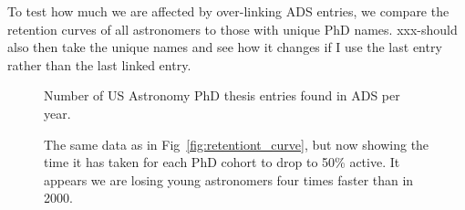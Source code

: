 \documentclass{emulateapj}
\begin{document}
To test how much we are affected by over-linking ADS entries, we compare the retention curves of all astronomers to those with unique PhD names.  xxx-should also then take the unique names and see how it changes if I use the last entry rather than the last linked entry.


\begin{figure}
  \caption{Number of US Astronomy PhD thesis entries found in ADS per year. \label{fig:phdperyear}}
\end{figure}


\begin{figure*}
  \caption{The fraction of Astronomy PhDs still active as first authors.  Error bars show ranges computed by comparing the curves to those of just authors with unique names and uique names where all records are assumed to be linked.   \label{fig:retentiont_curve}}
\end{figure*}

\begin{figure}
\caption{The same data as in Fig~\ref{fig:retentiont_curve}, but now showing the time it has taken for each PhD cohort to drop to 50\% active.  It appears we are losing young astronomers four times faster than in 2000.  \label{fig:retention_50}}
\end{figure}




\end{document}
